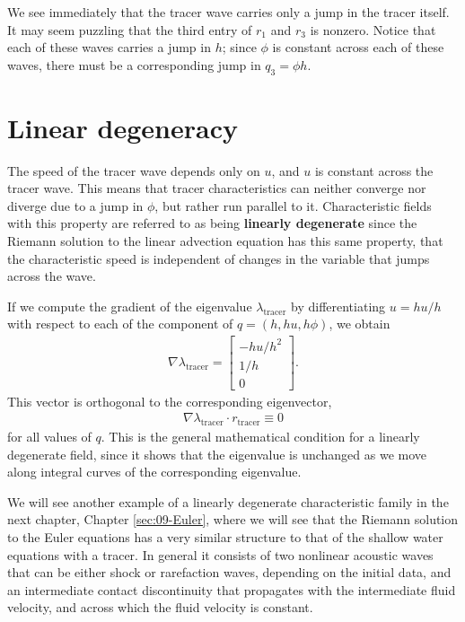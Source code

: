 \documentclass{SIAMbook2016}
\begin{document}
We see immediately that the tracer wave carries only a jump in the
tracer itself. It may seem puzzling that the third entry of \(r_1\) and
\(r_3\) is nonzero. Notice that each of these waves carries a jump in
\(h\); since \(\phi\) is constant across each of these waves, there must
be a corresponding jump in \(q_3=\phi h\).

\hypertarget{linear-degeneracy}{%
\section{Linear degeneracy}\label{linear-degeneracy}}

The speed of the tracer wave depends only on \(u\), and \(u\) is
constant across the tracer wave. This means that tracer characteristics
can neither converge nor diverge due to a jump in \(\phi\), but rather
run parallel to it. Characteristic fields with this property are
referred to as being \textbf{linearly degenerate} since the Riemann
solution to the linear advection equation has this same property, that
the characteristic speed is independent of changes in the variable that
jumps across the wave.

If we compute the gradient of the eigenvalue \(\lambda_\text{tracer}\)
by differentiating \(u = hu/h\) with respect to each of the component of
\(q=(h, hu, h\phi)\), we obtain \begin{align} \label{SW:gradu}
\nabla \lambda_\text{tracer} = \begin{bmatrix} -hu/h^2\\ 1/h \\ 0\end{bmatrix}.
\end{align} This vector is orthogonal to the corresponding eigenvector,
\begin{align} \label{SW:lindeg}
\nabla \lambda_\text{tracer} \cdot r_\text{tracer} \equiv 0
\end{align} for all values of \(q\). This is the general mathematical
condition for a linearly degenerate field, since it shows that the
eigenvalue is unchanged as we move along integral curves of the
corresponding eigenvalue.

We will see another example of a linearly degenerate characteristic
family in the next chapter, Chapter \ref{sec:09-Euler}, where we will
see that the Riemann solution to the Euler equations has a very similar
structure to that of the shallow water equations with a tracer. In
general it consists of two nonlinear acoustic waves that can be either
shock or rarefaction waves, depending on the initial data, and an
intermediate contact discontinuity that propagates with the intermediate
fluid velocity, and across which the fluid velocity is constant.
\end{document}
